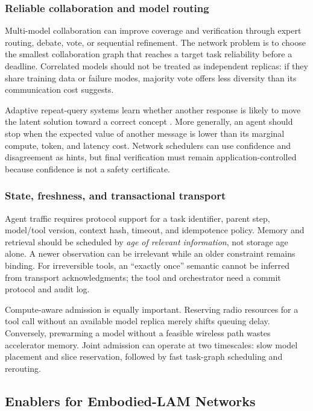 \documentclass[letterpaper,journal]{IEEEtran}
\begin{document}
\subsubsection{Reliable collaboration and model routing}
Multi-model collaboration can improve coverage and verification through
expert routing, debate, vote, or sequential refinement. The network problem
is to choose the smallest collaboration graph that reaches a target task
reliability before a deadline. Correlated models should not be treated as
independent replicas: if they share training data or failure modes, majority
vote offers less diversity than its communication cost suggests.

Adaptive repeat-query systems learn whether another response is likely to
move the latent solution toward a correct concept \cite{garq}. More generally,
an agent should stop when the expected value of another message is lower than
its marginal compute, token, and latency cost. Network schedulers can use
confidence and disagreement as hints, but final verification must remain
application-controlled because confidence is not a safety certificate.

\subsubsection{State, freshness, and transactional transport}
Agent traffic requires protocol support for a task identifier, parent step,
model/tool version, context hash, timeout, and idempotence policy. Memory and
retrieval should be scheduled by \emph{age of relevant information}, not
storage age alone. A newer observation can be irrelevant while an older
constraint remains binding. For irreversible tools, an ``exactly once''
semantic cannot be inferred from transport acknowledgments; the tool and
orchestrator need a commit protocol and audit log.

Compute-aware admission is equally important. Reserving radio resources for a
tool call without an available model replica merely shifts queuing delay.
Conversely, prewarming a model without a feasible wireless path wastes
accelerator memory. Joint admission can operate at two timescales: slow model
placement and slice reservation, followed by fast task-graph scheduling and
rerouting.

\subsection{Enablers for Embodied-LAM Networks}
\end{document}
